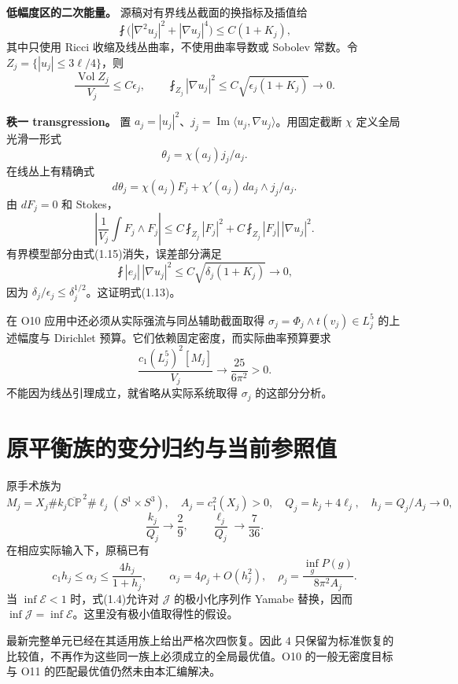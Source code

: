 \documentclass[UTF8,11pt,fontset=none]{ctexart}
\theoremstyle{definition}
\theoremstyle{remark}
\begin{document}
\textbf{低幅度区的二次能量。} 源稿对有界线丛截面的换指标及插值给 \[
 \fint\bigl(|\nabla^2u_j|^2+|\nabla u_j|^4\bigr)
 \le C(1+K_j),
\] 其中只使用 Ricci 收缩及线丛曲率，不使用曲率导数或 Sobolev 常数。令 \(Z_j=\{|u_j|\le3\ell/4\}\)，则 \[
 \frac{\operatorname{Vol}Z_j}{V_j}\le C\epsilon_j,
 \qquad
 \fint_{Z_j}|\nabla u_j|^2\le C\sqrt{\epsilon_j(1+K_j)}\to0.
\tag{1.15}
\]

\textbf{秩一 transgression。} 置 \(a_j=|u_j|^2\)、\(j_j=\operatorname{Im}\langle u_j,\nabla u_j\rangle\)。用固定截断 \(\chi\) 定义全局光滑一形式 \[
 \theta_j=\chi(a_j)j_j/a_j.
\] 在线丛上有精确式 \[
 d\theta_j=\chi(a_j)F_j+\chi'(a_j)\,da_j\wedge j_j/a_j.
\] 由 \(dF_j=0\) 和 Stokes， \[
 \left|\frac1{V_j}\int F_j\wedge F_j\right|
 \le C\fint_{Z_j}|F_j|^2
     +C\fint_{Z_j}|F_j|\,|\nabla u_j|^2.
\] 有界模型部分由式(1.15)消失，误差部分满足 \[
 \fint |e_j|\,|\nabla u_j|^2
 \le C\sqrt{\delta_j(1+K_j)}\to0,
\] 因为 \(\delta_j/\epsilon_j\le\delta_j^{1/2}\)。这证明式(1.13)。\cite{I02}

在 O10 应用中还必须从实际强流与同丛辅助截面取得 \(\sigma_j=\Phi_j\wedge t(v_j)\in L_j^5\) 的上述幅度与 Dirichlet 预算。它们依赖固定密度，而实际曲率预算要求 \[
 \frac{c_1(L_j^5)^2[M_j]}{V_j}\to\frac{25}{6\pi^2}>0.
\] 不能因为线丛引理成立，就省略从实际系统取得 \(\sigma_j\) 的这部分分析。

\section{原平衡族的变分归约与当前参照值}\label{v1-ux539fux5e73ux8861ux65cfux7684ux53d8ux5206ux5f52ux7ea6ux4e0eux5f53ux524dux53c2ux7167ux503c}

原手术族为 \[
 M_j=X_j\#k_j\overline{\mathbb{CP}}^{\,2}\#\ell_j(S^1\times S^3),
 \quad A_j=c_1^2(X_j)>0,\quad Q_j=k_j+4\ell_j,\quad h_j=Q_j/A_j\to0,
\] \[
 \frac{k_j}{Q_j}\to\frac29,\qquad \frac{\ell_j}{Q_j}\to\frac7{36}.
\] 在相应实际输入下，原稿已有 \[
 c_1h_j\le\alpha_j\le\frac{4h_j}{1+h_j},\qquad
 \alpha_j=4\rho_j+O(h_j^2),\quad
 \rho_j=\frac{\inf_gP(g)}{8\pi^2A_j}.
\tag{1.16}
\] 当 \(\inf\mathcal E<1\) 时，式(1.4)允许对 \(\mathcal J\) 的极小化序列作 Yamabe 替换，因而 \(\inf\mathcal J=\inf\mathcal E\)。这里没有极小值取得性的假设。

最新完整单元已经在其适用族上给出严格次四恢复。因此 \(4\) 只保留为标准恢复的比较值，不再作为这些同一族上必须成立的全局最优值。O10 的一般无密度目标与 O11 的匹配最优值仍然未由本汇编解决。\cite{B01,R03,R04}
\end{document}
